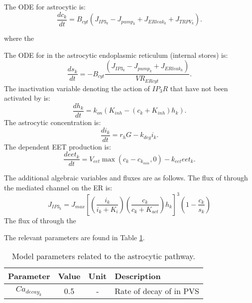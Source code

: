 	The ODE for astrocytic \ca is:
	\begin{equation}
	\frac{d c_k}{dt} = B_{cyt} \left( J_{IP3_k} - J_{pump_k} + J_{ERleak_k} + J_{TRPV_k} \right). 
	\end{equation}
	
	where the
	
	
	The ODE for \ca in the astrocytic endoplasmic reticulum (internal stores) is:
	\begin{equation}
	\frac{d s_k}{dt} = - B_{cyt} \frac{ \left( J_{IP3_k} - J_{pump_k} + J_{ERleak_k} \right)}{VR_{ERcyt}}. 
	\end{equation}
	The inactivation variable denoting the action of $IP_3R$ that have not been activated by \ca is:
	\begin{equation}
	\frac{d h_k}{dt} = k_{on} \left( K_{inh} - (c_k + K_{inh}) h_k \right).
	\end{equation}
	The astrocytic \ip concentration is:
	\begin{equation}
	\frac{d i_k}{dt} = r_h G - k_{deg} i_k.
	\end{equation}
	The \ca dependent EET production is:
	\begin{equation}
	\frac{d eet_k}{dt} = V_{eet} \max(c_k - c_{k_{min}}, 0) - k_{eet} eet_k.
	\end{equation}
	
	The additional algebraic variables and fluxes are as follows.
	The flux of \ca through the \ip mediated channel on the ER is: 
	\begin{equation}
	J_{IP3_k} = J_{max} \left[  \left(\frac{i_k}{i_k + K_i}\right) \left(\frac{c_k}{c_k + K_{act}}\right) h_k \right]^3
				\left( 1 - \frac{c_k}{s_k}  \right)  
	\end{equation}
	The flux of \ca through the 
	
	
	
	The relevant parameters are found in Table \ref{tab:NVU12accaparam}. 
				
				\begin{table}[h!]
					\small
					\centering
						\begin{tabular}{c c c l}
					\hline
					Parameter & Value & Unit & Description \\
					\hline
					$Ca_{decay_k}$ & 0.5 & - & Rate of decay of \ca in PVS \\

					\hline
						\end{tabular}
						\caption{Model parameters related to the astrocytic \ca pathway.}
						\label{tab:NVU12accaparam}
				\end{table}
	

